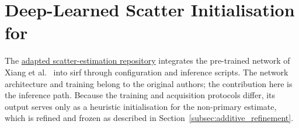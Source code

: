\section[Deep-learned scatter initialisation]{Deep-Learned Scatter Initialisation for }
\label{app:scatter_dl}

The \href{https://github.com/samdporter/spect-scatter-deep-learning}{adapted scatter-estimation repository} integrates the pre-trained network of Xiang et al.\ \cite{xiangDeepNeuralNetwork2020} into \gls{sirf} through configuration and inference scripts. The network architecture and training belong to the original authors; the contribution here is the  inference path. Because the training and acquisition protocols differ, its output serves only as a heuristic initialisation for the non-primary estimate, which is refined and frozen as described in Section~\ref{subsec:additive_refinement}.
